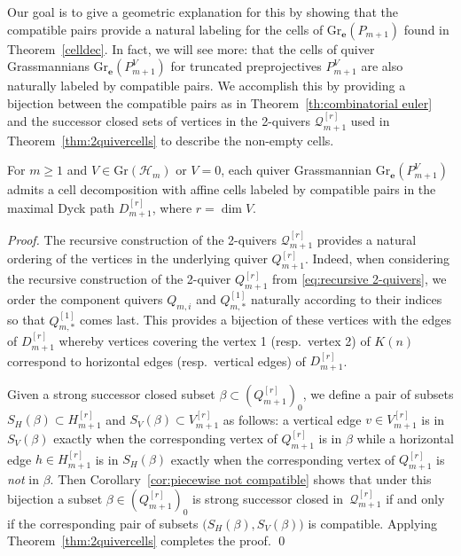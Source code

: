 \documentclass[smallextended,envcountsect,envcountsame]{svjour3}
\numberwithin{equation}{section}
\newcommand{\bfe}{\mathbf{e}}
\newcommand{\cH}{\mathcal{H}}
\newcommand{\cQ}{\mathcal{Q}}
\newcommand{\Gr}{\mathrm{Gr}}
\begin{document}
Our goal is to give a geometric explanation for this by showing that the compatible pairs provide a natural labeling for the cells of $\Gr_\bfe(P_{m+1})$ found in Theorem~\ref{celldec}.
In fact, we will see more: that the cells of quiver Grassmannians $\Gr_\bfe(P_{m+1}^V)$ for truncated preprojectives $P_{m+1}^V$ are also naturally labeled by compatible pairs.
We accomplish this by providing a bijection between the compatible pairs as in Theorem~\ref{th:combinatorial euler} and the successor closed sets of vertices in the 2-quivers $\cQ_{m+1}^{[r]}$ used in Theorem~\ref{thm:2quivercells} to describe the non-empty cells.
\begin{theorem}
  \label{th:compatible cells}
  For $m\ge1$ and $V\in\Gr(\cH_m)$ or $V=0$, each quiver Grassmannian $\Gr_\bfe(P_{m+1}^V)$ admits a cell decomposition with affine cells labeled by compatible pairs in the maximal Dyck path $D_{m+1}^{[r]}$, where $r=\dim V$.
\end{theorem}
\begin{proof}
  The recursive construction of the 2-quivers $\cQ_{m+1}^{[r]}$ provides a natural ordering of the vertices in the underlying quiver $Q_{m+1}^{[r]}$.
  Indeed, when considering the recursive construction of the 2-quiver $Q_{m+1}^{[r]}$ from \eqref{eq:recursive 2-quivers}, we order the component quivers $Q_{m,i}$ and $Q_{m,*}^{[1]}$ naturally according to their indices so that $Q_{m,*}^{[1]}$ comes last.
  This provides a bijection of these vertices with the edges of $D_{m+1}^{[r]}$ whereby vertices covering the vertex 1 (resp.\ vertex 2) of $K(n)$ correspond to horizontal edges (resp.\ vertical edges) of $D_{m+1}^{[r]}$.

  Given a strong successor closed subset $\beta\subset(Q_{m+1}^{[r]})_0$, we define a pair of subsets $S_H(\beta)\subset H_{m+1}^{[r]}$ and $S_V(\beta)\subset V_{m+1}^{[r]}$ as follows: a vertical edge $v\in V_{m+1}^{[r]}$ is in $S_V(\beta)$ exactly when the corresponding vertex of $Q_{m+1}^{[r]}$ is in $\beta$ while a horizontal edge $h\in H_{m+1}^{[r]}$ is in $S_H(\beta)$ exactly when the corresponding vertex of $Q_{m+1}^{[r]}$ is \emph{not} in $\beta$.
  Then Corollary~\ref{cor:piecewise not compatible} shows that under this bijection a subset $\beta\in(Q_{m+1}^{[r]})_0$ is strong successor closed in~$\cQ_{m+1}^{[r]}$ if and only if the corresponding pair of subsets $\big(S_H(\beta),S_V(\beta)\big)$ is compatible.
  Applying Theorem~\ref{thm:2quivercells} completes the proof.
\qed\end{proof}
\end{document}
